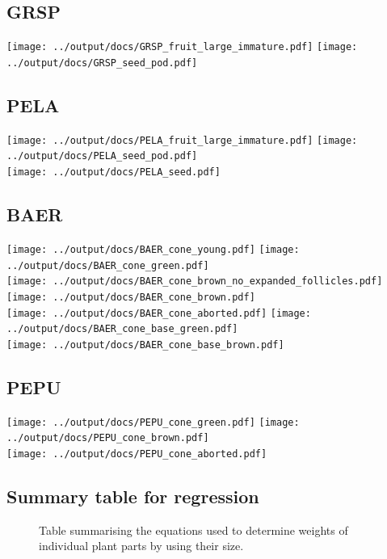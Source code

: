 \documentclass[10pt]{book} %
\begin{document}
\subsection{GRSP}
\begin{center}
\texttt{[image: ../output/docs/GRSP\_fruit\_large\_immature.pdf]}
\texttt{[image: ../output/docs/GRSP\_seed\_pod.pdf]}
\end{center}

\subsection{PELA}
\begin{center}
\texttt{[image: ../output/docs/PELA\_fruit\_large\_immature.pdf]}
\texttt{[image: ../output/docs/PELA\_seed\_pod.pdf]}\\
\texttt{[image: ../output/docs/PELA\_seed.pdf]}
\end{center}

\subsection{BAER}
\begin{center}
\texttt{[image: ../output/docs/BAER\_cone\_young.pdf]}
\texttt{[image: ../output/docs/BAER\_cone\_green.pdf]}\\
\texttt{[image: ../output/docs/BAER\_cone\_brown\_no\_expanded\_follicles.pdf]}
\texttt{[image: ../output/docs/BAER\_cone\_brown.pdf]}\\
\texttt{[image: ../output/docs/BAER\_cone\_aborted.pdf]}
\texttt{[image: ../output/docs/BAER\_cone\_base\_green.pdf]}\\
\texttt{[image: ../output/docs/BAER\_cone\_base\_brown.pdf]}
\end{center}

\subsection{PEPU}
\begin{center}
\texttt{[image: ../output/docs/PEPU\_cone\_green.pdf]}
\texttt{[image: ../output/docs/PEPU\_cone\_brown.pdf]}\\
\texttt{[image: ../output/docs/PEPU\_cone\_aborted.pdf]}
\end{center}
\newpage
\subsection{Summary table for regression}
\begin{figure}[h!]
\begin{center}

\end{center}
\caption{Table summarising the equations used to determine weights of individual plant parts by using their size.}
\end{figure}
\end{document}
